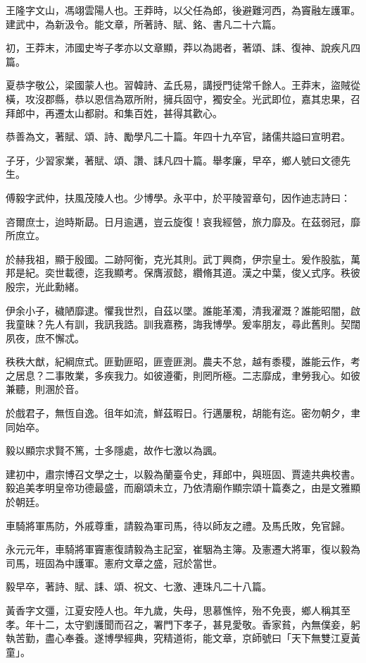 \begin{pinyinscope}
王隆字文山，馮翊雲陽人也。王莽時，以父任為郎，後避難河西，為竇融左護軍。建武中，為新汲令。能文章，所著詩、賦、銘、書凡二十六篇。

初，王莽末，沛國史岑子孝亦以文章顯，莽以為謁者，著頌、誄、復神、說疾凡四篇。

夏恭字敬公，梁國蒙人也。習韓詩、孟氏易，講授門徒常千餘人。王莽末，盜賊從橫，攻沒郡縣，恭以恩信為眾所附，擁兵固守，獨安全。光武即位，嘉其忠果，召拜郎中，再遷太山都尉。和集百姓，甚得其歡心。

恭善為文，著賦、頌、詩、勵學凡二十篇。年四十九卒官，諸儒共謚曰宣明君。

子牙，少習家業，著賦、頌、讚、誄凡四十篇。舉孝廉，早卒，鄉人號曰文德先生。

傅毅字武仲，扶風茂陵人也。少博學。永平中，於平陵習章句，因作迪志詩曰：

咨爾庶士，迨時斯勗。日月逾邁，豈云旋復！哀我經營，旅力靡及。在茲弱冠，靡所庶立。

於赫我祖，顯于殷國。二跡阿衡，克光其則。武丁興商，伊宗皇士。爰作股肱，萬邦是紀。奕世載德，迄我顯考。保膺淑懿，纘脩其道。漢之中葉，俊乂式序。秩彼殷宗，光此勳緒。

伊余小子，穢陋靡逮。懼我世烈，自茲以墜。誰能革濁，清我濯溉？誰能昭闇，啟我童昧？先人有訓，我訊我誥。訓我嘉務，誨我博學。爰率朋友，尋此舊則。契闊夙夜，庶不懈忒。

秩秩大猷，紀綱庶式。匪勤匪昭，匪壹匪測。農夫不怠，越有黍稷，誰能云作，考之居息？二事敗業，多疾我力。如彼遵衢，則罔所極。二志靡成，聿勞我心。如彼兼聽，則溷於音。

於戲君子，無恆自逸。徂年如流，鮮茲暇日。行邁屢稅，胡能有迄。密勿朝夕，聿同始卒。

毅以顯宗求賢不篤，士多隱處，故作七激以為諷。

建初中，肅宗博召文學之士，以毅為蘭臺令史，拜郎中，與班固、賈逵共典校書。毅追美孝明皇帝功德最盛，而廟頌未立，乃依清廟作顯宗頌十篇奏之，由是文雅顯於朝廷。

車騎將軍馬防，外戚尊重，請毅為軍司馬，待以師友之禮。及馬氏敗，免官歸。

永元元年，車騎將軍竇憲復請毅為主記室，崔駰為主簿。及憲遷大將軍，復以毅為司馬，班固為中護軍。憲府文章之盛，冠於當世。

毅早卒，著詩、賦、誄、頌、祝文、七激、連珠凡二十八篇。

黃香字文彊，江夏安陸人也。年九歲，失母，思慕憔悴，殆不免喪，鄉人稱其至孝。年十二，太守劉護聞而召之，署門下孝子，甚見愛敬。香家貧，內無僕妾，躬執苦勤，盡心奉養。遂博學經典，究精道術，能文章，京師號曰「天下無雙江夏黃童」。


\end{pinyinscope}
